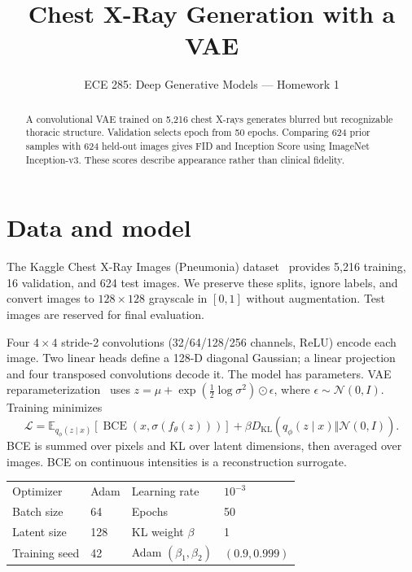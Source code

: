 \documentclass{article}
\title{Chest X-Ray Generation with a VAE}
\author{ECE 285: Deep Generative Models --- Homework 1}
\begin{document}
\maketitle
\begin{abstract}
A convolutional VAE trained on 5,216 chest X-rays generates blurred but
recognizable thoracic structure. Validation selects epoch \SelectedEpoch{} from
50 epochs. Comparing 624 prior samples with 624 held-out images gives FID
\FIDvalue{} and Inception Score \ISvalue{} using ImageNet Inception-v3.
These scores describe appearance rather than clinical fidelity.
\end{abstract}

\section{Data and model}
The Kaggle Chest X-Ray Images (Pneumonia) dataset~\cite{dataset} provides
5,216 training, 16 validation, and 624 test images. We preserve these splits,
ignore labels, and convert images to $128\times128$ grayscale in $[0,1]$ without
augmentation. Test images are reserved for final evaluation.

Four $4\times4$ stride-2 convolutions (32/64/128/256 channels, ReLU) encode each
image. Two linear heads define a 128-D diagonal Gaussian; a linear projection
and four transposed convolutions decode it. The model has \ParamCount{}
parameters. VAE reparameterization~\cite{vae} uses
$z=\mu+\exp(\tfrac12\log\sigma^2)\odot\epsilon$, where
$\epsilon\sim\mathcal N(0,I)$. Training minimizes
\begin{equation}
\mathcal L=\mathbb E_{q_\phi(z\mid x)}[\operatorname{BCE}(x,\sigma(f_\theta(z)))]
+\beta D_{\mathrm{KL}}(q_\phi(z\mid x)\Vert\mathcal N(0,I)).
\end{equation}
BCE is summed over pixels and KL over latent dimensions, then averaged over
images. BCE on continuous intensities is a reconstruction surrogate.

\begin{center}
\small
\begin{tabular}{ll@{\qquad}ll}
\toprule
Optimizer & Adam & Learning rate & $10^{-3}$\\
Batch size & 64 & Epochs & 50\\
Latent size & 128 & KL weight $\beta$ & 1\\
Training seed & 42 & Adam $(\beta_1,\beta_2)$ & $(0.9,0.999)$\\
\bottomrule
\end{tabular}
\end{center}
\end{document}
